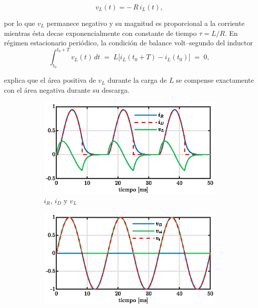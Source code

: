 \documentclass[conference]{IEEEtran}
\begin{document}
\begin{equation*}
	v_L(t)=-\,R\,i_L(t),
\end{equation*}

por lo que $v_L$ permanece negativo y su magnitud es proporcional a la corriente mientras ésta decae exponencialmente con constante de tiempo $\tau=L/R$. En régimen estacionario periódico, la condición de balance volt–segundo del inductor
\begin{equation*}
	\int_{t_0}^{t_0+T} v_L(t)\,dt \;=\; L\big[i_L(t_0+T)-i_L(t_0)\big]\;=\;0,
\end{equation*}

explica que el área positiva de $v_L$ durante la carga de $L$ se compense exactamente con el área negativa durante su descarga.

\begin{figure}[ht]
  \centering
  \begin{subfigure}[t]{0.5\textwidth}
    \centering
    \includegraphics[width=\linewidth]{figuras/ir_id_vl.eps}
    \caption{$i_R$, $i_D$ y $v_L$}
    \label{fig:ir-id-vl}
  \end{subfigure}\hfill
  \begin{subfigure}[t]{0.5\textwidth}
    \centering
    \includegraphics[width=\linewidth]{figuras/voi_vi.eps}

\end{subfigure}
\end{figure}
\end{document}
